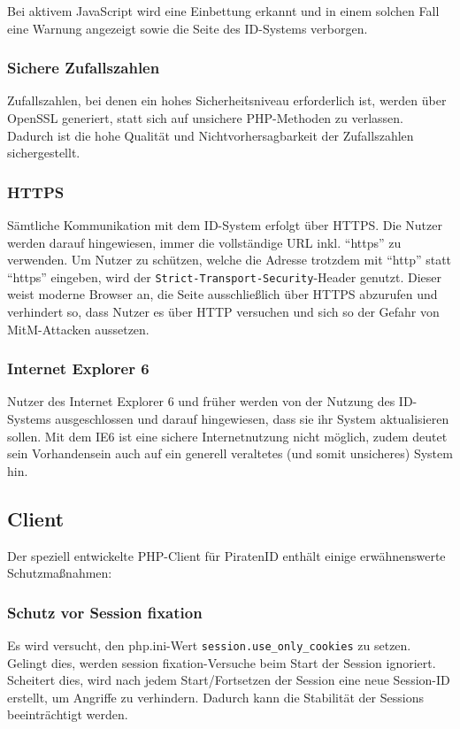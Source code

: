 \documentclass[parskip=half]{scrartcl}
\begin{document}
Bei aktivem JavaScript wird eine Einbettung erkannt und in einem solchen Fall eine Warnung angezeigt sowie die Seite des ID-Systems verborgen.

\subsubsection{Sichere Zufallszahlen}
Zufallszahlen, bei denen ein hohes Sicherheitsniveau erforderlich ist, werden über OpenSSL generiert, statt sich auf unsichere PHP-Methoden zu verlassen.
Dadurch ist die hohe Qualität und Nichtvorhersagbarkeit der Zufallszahlen sichergestellt.

\subsubsection{HTTPS}
Sämtliche Kommunikation mit dem ID-System erfolgt über HTTPS.
Die Nutzer werden darauf hingewiesen, immer die vollständige URL inkl. "`https"' zu verwenden.
Um Nutzer zu schützen, welche die Adresse trotzdem mit "`http"' statt "`https"' eingeben, wird der \texttt{Strict-Transport-Security}-Header genutzt.
Dieser weist moderne Browser an, die Seite ausschließlich über HTTPS abzurufen und verhindert so,
dass Nutzer es über HTTP versuchen und sich so der Gefahr von MitM-Attacken aussetzen.

\subsubsection{Internet Explorer 6}
Nutzer des Internet Explorer 6 und früher werden von der Nutzung des ID-Systems ausgeschlossen und darauf hingewiesen, dass sie ihr System aktualisieren sollen.
Mit dem IE6 ist eine sichere Internetnutzung nicht möglich, zudem deutet sein Vorhandensein auch auf ein generell veraltetes (und somit unsicheres) System hin.



\subsection{Client}
\label{sec:security-client}
Der speziell entwickelte PHP-Client für PiratenID enthält einige erwähnenswerte Schutzmaßnahmen:

\subsubsection{Schutz vor Session fixation}
Es wird versucht, den php.ini-Wert \texttt{session.use\_only\_cookies} zu setzen.
Gelingt dies, werden session fixation-Versuche beim Start der Session ignoriert.
Scheitert dies, wird nach jedem Start/Fortsetzen der Session eine neue Session-ID erstellt, um Angriffe zu verhindern.
Dadurch kann die Stabilität der Sessions beeinträchtigt werden.
\end{document}
